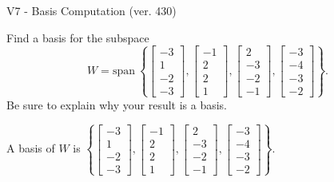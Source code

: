 \begin{exercise}
  \begin{exerciseTitle}V7 - Basis Computation (ver. 430)\end{exerciseTitle}
  \begin{exerciseStatement}
    Find a basis for the subspace 
\[W=\mathrm{span}\ \left\{\left[\begin{array}{r}
-3 \\
1 \\
-2 \\
-3
\end{array}\right] , \left[\begin{array}{r}
-1 \\
2 \\
2 \\
1
\end{array}\right] , \left[\begin{array}{r}
2 \\
-3 \\
-2 \\
-1
\end{array}\right] , \left[\begin{array}{r}
-3 \\
-4 \\
-3 \\
-2
\end{array}\right]\right\}.\]
 Be sure to explain why your result is a basis.


  \end{exerciseStatement}
  \begin{exerciseAnswer}
   A basis of \(W\) is  \(\left\{\left[\begin{array}{r}
-3 \\
1 \\
-2 \\
-3
\end{array}\right] , \left[\begin{array}{r}
-1 \\
2 \\
2 \\
1
\end{array}\right] , \left[\begin{array}{r}
2 \\
-3 \\
-2 \\
-1
\end{array}\right] , \left[\begin{array}{r}
-3 \\
-4 \\
-3 \\
-2
\end{array}\right]\right\}\).
  


  \end{exerciseAnswer}
\end{exercise}